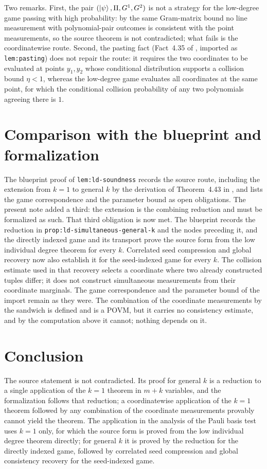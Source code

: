 \documentclass[11pt]{article}
\begin{document}
Two remarks.  First, the pair $(\ket{\psi}, \Pi, G^1, G^2)$ is not a
strategy for the low-degree game passing with high probability: by the same
Gram-matrix bound no line measurement with polynomial-pair outcomes is
consistent with the point measurements, so the source theorem is not
contradicted; what fails is the coordinatewise route.  Second, the pasting
fact (Fact~4.35 of \cite{Natarajan2018NEEXP}, imported as
\texttt{lem:pasting}) does not repair the route: it requires the two
coordinates to be evaluated at points $y_1, y_2$ whose conditional
distribution supports a collision bound $\eta < 1$, whereas the low-degree
game evaluates all coordinates at the same point, for which the conditional
collision probability of any two polynomials agreeing there is $1$.

\section{Comparison with the blueprint and formalization}

The blueprint proof of \texttt{lem:ld-soundness} records the source route,
including the extension from $k = 1$ to general $k$ by the derivation of
Theorem~4.43 in \cite{Natarajan2018NEEXP}, and lists the game
correspondence and the parameter bound as open obligations.  The present
note added a third: the extension is the combining reduction and must be
formalized as such.  That third obligation is now met.  The blueprint records
the reduction in \texttt{prop:ld-simultaneous-general-k} and the nodes
preceding it, and the directly indexed game and its transport prove the source
form from the low individual degree theorem for every $k$. Correlated seed
compression and global recovery now also establish it for the seed-indexed
game for every $k$. The collision estimate used in that recovery selects a
coordinate where two already constructed tuples differ; it does not construct
simultaneous measurements from their coordinate marginals. The game
correspondence and the parameter bound of the import remain as they were.  The
combination of the coordinate measurements by the sandwich is defined and is a
POVM, but it carries no consistency estimate, and by the computation above it
cannot; nothing depends on it.

\section{Conclusion}

The source statement is not contradicted.  Its proof for general $k$ is a
reduction to a single application of the $k = 1$ theorem in $m + k$
variables, and the formalization follows that reduction; a
coordinatewise application of the $k = 1$ theorem followed by any
combination of the coordinate measurements provably cannot yield the
theorem.  The application in the analysis of the Pauli basis test uses
$k = 1$ only, for which the source form is proved from the low individual
degree theorem directly; for general $k$ it is proved by the reduction for
the directly indexed game, followed by correlated seed compression and global
consistency recovery for the seed-indexed game.



\end{document}
